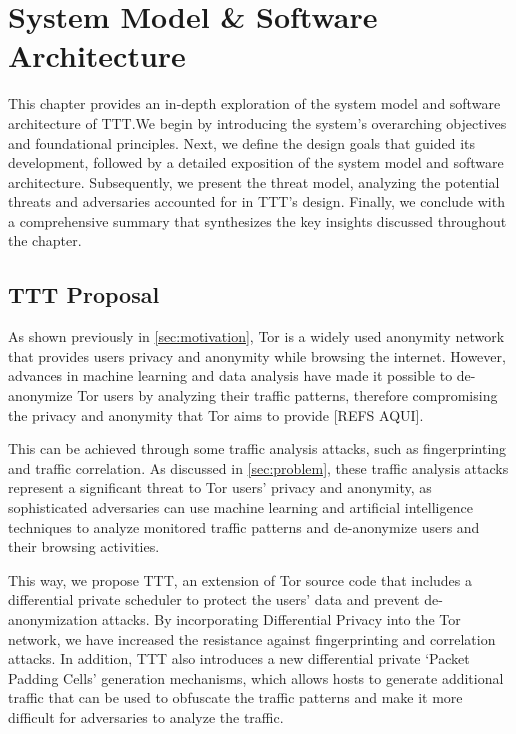 
%

\makeatletter
\newcommand{\ntifpkgloaded}{%
  \@ifpackageloaded%
}
\makeatother


\chapter{System Model \& Software Architecture}\label{cha:system_model}

This chapter provides an in-depth exploration of the system model and software architecture of TTT.\@ We begin by introducing the system's overarching objectives and foundational principles. Next, we define the design goals that guided its development, followed by a detailed exposition of the system model and software architecture. Subsequently, we present the threat model, analyzing the potential threats and adversaries accounted for in TTT's design. Finally, we conclude with a comprehensive summary that synthesizes the key insights discussed throughout the chapter.

\section{TTT Proposal}\label{sec:system_propostal}

As shown previously in \autoref{sec:motivation}, Tor is a widely used anonymity network that provides users privacy and anonymity while browsing the internet. However, advances in machine learning and data analysis have made it possible to de-anonymize Tor users by analyzing their traffic patterns, therefore compromising the privacy and anonymity that Tor aims to provide [REFS AQUI]. 

This can be achieved through some traffic analysis attacks, such as fingerprinting and traffic correlation. As discussed in \autoref{sec:problem}, these traffic analysis attacks represent a significant threat to Tor users' privacy and anonymity, as sophisticated adversaries can use machine learning and artificial intelligence techniques to analyze monitored traffic patterns and de-anonymize users and their browsing activities.

This way, we propose TTT, an extension of Tor source code that includes a differential private scheduler to protect the users' data and prevent de-anonymization attacks. By incorporating Differential Privacy into the Tor network, we have increased the resistance against fingerprinting and correlation attacks. In addition, TTT also introduces a new differential private `Packet Padding Cells' generation mechanisms, which allows hosts to generate additional traffic that can be used to obfuscate the traffic patterns and make it more difficult for adversaries to analyze the traffic.


